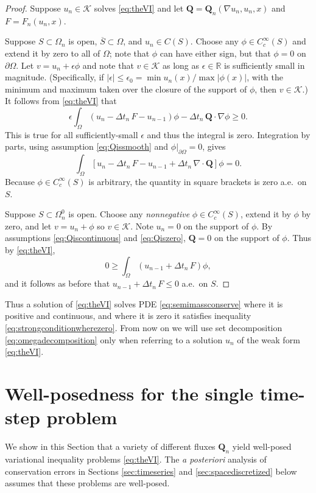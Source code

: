 \documentclass[final,leqno,onefignum,onetabnum]{siamltex1213bueler}
\newcommand\bQ{\mathbf{Q}}
\newcommand{\Div}{\nabla\cdot}
\newcommand\eps{\epsilon}
\renewcommand{\grad}{\nabla}
\newcommand\RR{\mathbb{R}}
\begin{document}
\begin{proof}  Suppose $u_n\in\mathcal{K}$ solves \eqref{eq:theVI} and let $\bQ = \bQ_n(\grad u_n,u_n,x)$ and $F=F_n(u_n,x)$.

Suppose $S \subset \Omega_n$ is open, $\overline{S}\subset \Omega$, and $u_n\in C(S)$.  Choose any $\phi\in C_c^\infty(S)$ and extend it by zero to all of $\Omega$; note that $\phi$ can have either sign, but that $\phi=0$ on $\partial\Omega$.  Let $v = u_n + \eps \phi$ and note that $v \in \mathcal{K}$ as long as $\eps\in\RR$ is sufficiently small in magnitude.  (Specifically, if $|\eps|\le \eps_0 = \min u_n(x) / \max |\phi(x)|$, with the minimum and maximum taken over the closure of the support of $\phi$, then $v \in \mathcal{K}$.)  It follows from \eqref{eq:theVI} that
   $$\eps \int_\Omega \left(u_n - \Delta t_n\,F - u_{n-1}\right)\phi - \Delta t_n\,\bQ \cdot \grad \phi \ge 0.$$
This is true for all sufficiently-small $\eps$ and thus the integral is zero.  Integration by parts, using assumption \eqref{eq:Qissmooth} and $\phi\big|_{\partial\Omega}=0$, gives
   $$\int_\Omega \left[ u_n - \Delta t_n\,F - u_{n-1} + \Delta t_n\,\Div\bQ \right]\phi = 0.$$
Because $\phi\in C_c^\infty(S)$ is arbitrary, the quantity in square brackets is zero a.e.~on $S$.

Suppose $S \subset \Omega_n^0$ is open.  Choose any \emph{nonnegative} $\phi\in C_c^\infty(S)$, extend it by $\phi$ by zero, and let $v = u_n + \phi$ so $v\in\mathcal{K}$.  Note $u_n=0$ on the support of $\phi$.  By assumptions \eqref{eq:Qiscontinuous} and \eqref{eq:Qiszero}, $\bQ=0$ on the support of $\phi$.  Thus by \eqref{eq:theVI},
    $$0 \ge \int_{\Omega} \left(u_{n-1} + \Delta t_n\, F\right) \phi,$$
and it follows as before that $u_{n-1} + \Delta t_n\, F \le 0$ a.e.~on $S$. \end{proof}

Thus a solution of \eqref{eq:theVI} solves PDE \eqref{eq:semimassconserve} where it is positive and continuous, and where it is zero it satisfies inequality \eqref{eq:strongconditionwherezero}.  From now on we will use set decomposition \eqref{eq:omegadecomposition} only when referring to a solution $u_n$ of the weak form \eqref{eq:theVI}.


\section{Well-posedness for the single time-step problem} \label{sec:wellposed}

We show in this Section that a variety of different fluxes $\bQ_n$ yield well-posed variational inequality problems \eqref{eq:theVI}.  The \emph{a posteriori} analysis of conservation errors in Sections \ref{sec:timeseries} and \ref{sec:spacediscretized} below assumes that these problems are well-posed.
\end{document}
